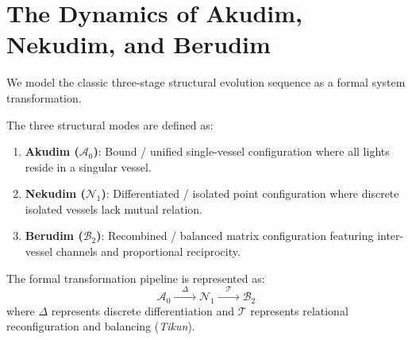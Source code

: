\section{The Dynamics of Akudim, Nekudim, and Berudim}
\label{sec:akudim_nekudim_berudim}

We model the classic three-stage structural evolution sequence as a formal system transformation.

\begin{definition}
The three structural modes are defined as:
\begin{enumerate}
    \item \textbf{Akudim ($\mathcal{A}_0$)}: Bound / unified single-vessel configuration where all lights reside in a singular vessel.
    \item \textbf{Nekudim ($\mathcal{N}_1$)}: Differentiated / isolated point configuration where discrete isolated vessels lack mutual relation.
    \item \textbf{Berudim ($\mathcal{B}_2$)}: Recombined / balanced matrix configuration featuring inter-vessel channels and proportional reciprocity.
\end{enumerate}
\end{definition}

The formal transformation pipeline is represented as:
\begin{equation}
\mathcal{A}_0 \xrightarrow{\quad \Delta \quad} \mathcal{N}_1 \xrightarrow{\quad \mathcal{T} \quad} \mathcal{B}_2
\end{equation}
where $\Delta$ represents discrete differentiation and $\mathcal{T}$ represents relational reconfiguration and balancing (\emph{Tikun}).
